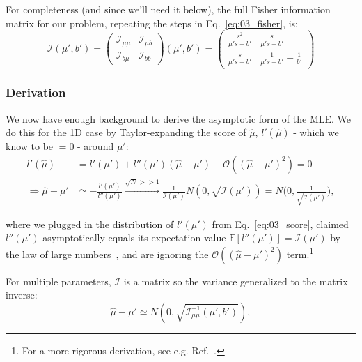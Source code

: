 For completeness (and since we'll need it below), the full Fisher information matrix for our problem, repeating the steps in Eq.~\ref{eq:03_fisher}, is:
\begin{equation}
    \mathcal I(\mu', b')
    = \begin{pmatrix}\mathcal I_{\mu\mu} & \mathcal I_{\mu b} \\ \mathcal I_{b\mu} & \mathcal I_{bb}\end{pmatrix}(\mu', b')
    = \begin{pmatrix}
    \frac{s^2}{\mu' s + b'} & \frac{s}{\mu' s + b'} \\ \frac{s}{\mu' s + b'} & \frac{1}{\mu' s + b'} + \frac{1}{b'}
    \end{pmatrix}
\label{eq:03_fishermatrix}
\end{equation}


\subsubsection{Derivation}
\label{sec:03_pmle_derivation}

We now have enough background to derive the asymptotic form of the MLE.
We do this for the 1D case by Taylor-expanding the score of $\hat \mu$, $l'(\hat\mu)$ - which we know to be $ = 0$ - around $\mu'$:
\begin{align}
l'(\hat\mu) &= l'(\mu') + l''(\mu')(\hat\mu - \mu') + \mathcal O((\hat\mu - \mu')^2) = 0 \\
\Rightarrow \hat\mu - \mu' &\simeq - \frac{l'(\mu')}{l''(\mu')} \xrightarrow{\sqrt{N} >> 1} \frac{1}{\mathcal I(\mu')}N(0, \sqrt{\mathcal I(\mu')}) = N\bigg(0, \frac{1}{\sqrt{\mathcal I(\mu')}}\bigg),
\label{eq:03_taylorl}
\end{align}

where we plugged in the distribution of $l'(\mu')$ from Eq.~\ref{eq:03_score}, claimed $l''(\mu')$ asymptotically equals its expectation value $\mathbb E[l''(\mu')] = \mathcal I(\mu')$ by the law of large numbers~\cite{enwiki:1256071749}, and are ignoring the $\mathcal O((\hat\mu - \mu')^2)$ term.\footnote{For a more rigorous derivation, see e.g. Ref.~\cite{gundersen_asymptotic_2019}.}

For multiple parameters, $\mathcal I$ is a matrix so the variance generalized to the matrix inverse:
\begin{equation}
    \hat\mu - \mu' \simeq N(0, \sqrt{\mathcal I^{-1}_{\mu\mu}(\mu', b')}),
\label{eq:03_asym_std_fisher}
\end{equation}

